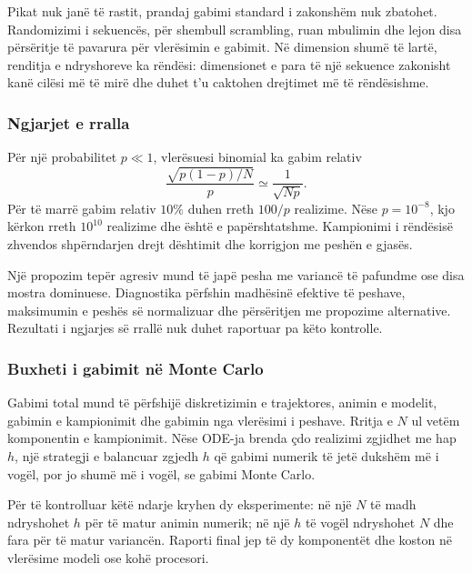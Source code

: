 Pikat nuk janë të rastit, prandaj gabimi standard i zakonshëm nuk zbatohet. Randomizimi i sekuencës, për shembull scrambling, ruan mbulimin dhe lejon disa përsëritje të pavarura për vlerësimin e gabimit. Në dimension shumë të lartë, renditja e ndryshoreve ka rëndësi: dimensionet e para të një sekuence zakonisht kanë cilësi më të mirë dhe duhet t'u caktohen drejtimet më të rëndësishme.

\subsubsection{Ngjarjet e rralla}
Për një probabilitet $p\ll1$, vlerësuesi binomial ka gabim relativ
\begin{equation}
 \frac{\sqrt{p(1-p)/N}}{p}\simeq\frac{1}{\sqrt{Np}}.
\end{equation}
Për të marrë gabim relativ $10\%$ duhen rreth $100/p$ realizime. Nëse $p=10^{-8}$, kjo kërkon rreth $10^{10}$ realizime dhe është e papërshtatshme. Kampionimi i rëndësisë zhvendos shpërndarjen drejt dështimit dhe korrigjon me peshën e gjasës.

Një propozim tepër agresiv mund të japë pesha me variancë të pafundme ose disa mostra dominuese. Diagnostika përfshin madhësinë efektive të peshave, maksimumin e peshës së normalizuar dhe përsëritjen me propozime alternative. Rezultati i ngjarjes së rrallë nuk duhet raportuar pa këto kontrolle.

\subsubsection{Buxheti i gabimit në Monte Carlo}
Gabimi total mund të përfshijë diskretizimin e trajektores, animin e modelit, gabimin e kampionimit dhe gabimin nga vlerësimi i peshave. Rritja e $N$ ul vetëm komponentin e kampionimit. Nëse ODE-ja brenda çdo realizimi zgjidhet me hap $h$, një strategji e balancuar zgjedh $h$ që gabimi numerik të jetë dukshëm më i vogël, por jo shumë më i vogël, se gabimi Monte Carlo.

Për të kontrolluar këtë ndarje kryhen dy eksperimente: në një $N$ të madh ndryshohet $h$ për të matur animin numerik; në një $h$ të vogël ndryshohet $N$ dhe fara për të matur variancën. Raporti final jep të dy komponentët dhe koston në vlerësime modeli ose kohë procesori.
